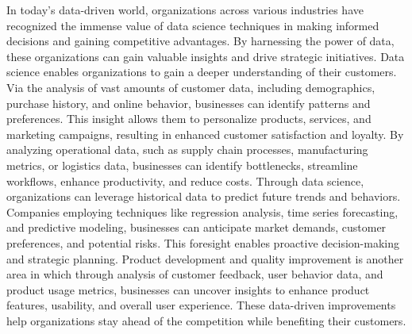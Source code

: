 \documentclass{vgtc}                          %
\begin{document}
In today's data-driven world, organizations across various industries have recognized the immense value of data science techniques in making informed decisions 
and gaining competitive advantages. By harnessing the power of data, these organizations can gain valuable insights and drive strategic initiatives. Data science 
enables organizations to gain a deeper understanding of their customers. Via the analysis of vast amounts of customer data, including demographics, purchase history, and 
online behavior, businesses can identify patterns and preferences. This insight allows them to personalize products, services, and marketing campaigns, resulting in 
enhanced customer satisfaction and loyalty. By analyzing operational data, such as supply chain processes, manufacturing metrics, or logistics data, businesses can 
identify bottlenecks, streamline workflows, enhance productivity, and reduce costs. Through data science, organizations can leverage historical data to predict future 
trends and behaviors. Companies employing techniques like regression analysis, time series forecasting, and predictive modeling, businesses can anticipate market demands, 
customer preferences, and potential risks. This foresight enables proactive decision-making and strategic planning. Product development and quality improvement is another 
area in which through analysis of customer feedback, user behavior data, and product usage metrics, businesses can uncover insights to enhance product features, usability, 
and overall user experience. These data-driven improvements help organizations stay ahead of the competition while benefiting their customers.\newline
\end{document}
